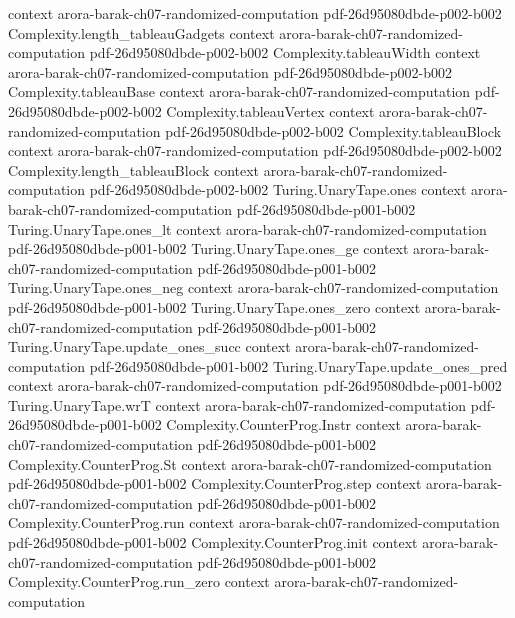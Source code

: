 \begin{theorem}
  {context}
  {arora-barak-ch07-randomized-computation}
  {pdf-26d95080dbde-p002-b002}
\proofstep
  {Complexity.length_tableauGadgets}
  {context}
  {arora-barak-ch07-randomized-computation}
  {pdf-26d95080dbde-p002-b002}
\proofstep
  {Complexity.tableauWidth}
  {context}
  {arora-barak-ch07-randomized-computation}
  {pdf-26d95080dbde-p002-b002}
\proofstep
  {Complexity.tableauBase}
  {context}
  {arora-barak-ch07-randomized-computation}
  {pdf-26d95080dbde-p002-b002}
\proofstep
  {Complexity.tableauVertex}
  {context}
  {arora-barak-ch07-randomized-computation}
  {pdf-26d95080dbde-p002-b002}
\proofstep
  {Complexity.tableauBlock}
  {context}
  {arora-barak-ch07-randomized-computation}
  {pdf-26d95080dbde-p002-b002}
\proofstep
  {Complexity.length_tableauBlock}
  {context}
  {arora-barak-ch07-randomized-computation}
  {pdf-26d95080dbde-p002-b002}
\proofstep
  {Turing.UnaryTape.ones}
  {context}
  {arora-barak-ch07-randomized-computation}
  {pdf-26d95080dbde-p001-b002}
\proofstep
  {Turing.UnaryTape.ones_lt}
  {context}
  {arora-barak-ch07-randomized-computation}
  {pdf-26d95080dbde-p001-b002}
\proofstep
  {Turing.UnaryTape.ones_ge}
  {context}
  {arora-barak-ch07-randomized-computation}
  {pdf-26d95080dbde-p001-b002}
\proofstep
  {Turing.UnaryTape.ones_neg}
  {context}
  {arora-barak-ch07-randomized-computation}
  {pdf-26d95080dbde-p001-b002}
\proofstep
  {Turing.UnaryTape.ones_zero}
  {context}
  {arora-barak-ch07-randomized-computation}
  {pdf-26d95080dbde-p001-b002}
\proofstep
  {Turing.UnaryTape.update_ones_succ}
  {context}
  {arora-barak-ch07-randomized-computation}
  {pdf-26d95080dbde-p001-b002}
\proofstep
  {Turing.UnaryTape.update_ones_pred}
  {context}
  {arora-barak-ch07-randomized-computation}
  {pdf-26d95080dbde-p001-b002}
\proofstep
  {Turing.UnaryTape.wrT}
  {context}
  {arora-barak-ch07-randomized-computation}
  {pdf-26d95080dbde-p001-b002}
\proofstep
  {Complexity.CounterProg.Instr}
  {context}
  {arora-barak-ch07-randomized-computation}
  {pdf-26d95080dbde-p001-b002}
\proofstep
  {Complexity.CounterProg.St}
  {context}
  {arora-barak-ch07-randomized-computation}
  {pdf-26d95080dbde-p001-b002}
\proofstep
  {Complexity.CounterProg.step}
  {context}
  {arora-barak-ch07-randomized-computation}
  {pdf-26d95080dbde-p001-b002}
\proofstep
  {Complexity.CounterProg.run}
  {context}
  {arora-barak-ch07-randomized-computation}
  {pdf-26d95080dbde-p001-b002}
\proofstep
  {Complexity.CounterProg.init}
  {context}
  {arora-barak-ch07-randomized-computation}
  {pdf-26d95080dbde-p001-b002}
\proofstep
  {Complexity.CounterProg.run_zero}
  {context}
  {arora-barak-ch07-randomized-computation}

\end{theorem}
